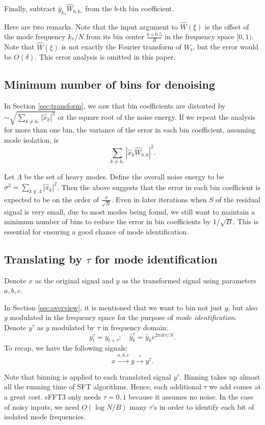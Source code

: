 \documentclass[10pt]{article}
\begin{document}
Finally, subtract $\hat{y}_{k_*} \hat{W}_{b,k_*}$ from the $b$-th bin coefficient.

Here are two remarks. Note that the input argument to $\hat{W}(\xi)$ is the offset of the mode frequency $k_*/N$ from its bin center $\frac{b+0.5}{B}$ in the frequency space $[0,1)$.  Note that $\hat{W}(\xi)$ is not exactly the Fourier transform of $W_t$, but the error would be $O(\delta)$. This error analysis is omitted in this paper.

\subsection{Minimum number of bins for denoising}

In Section \ref{sec:transform}, we saw that bin coefficients are distorted by $\sim \sqrt{\sum_{k\neq k_*} |\hat{x}_k|^2}$ or the square root of the noise energy. If we repeat the analysis for more than one bin, the variance of the error in each bin coefficient, assuming mode isolation, is
$$\sum_{k\neq k_*} |\hat{x}_k \hat{W}_{b,k}|^2.$$

Let $\Lambda$ be the set of heavy modes. Define the overall noise energy to be $\sigma^2 = \sum_{k\not\in \Lambda} |\hat{x}_k|^2$. Then the above suggests that the error in each bin coefficient is expected to be on the order of $\frac{\sigma}{\sqrt{B}}$. Even in later iterations when $S$ of the residual signal is very small, due to most modes being found, we still want to maintain a minimum number of bins to reduce the error in bin coefficients by $1/\sqrt{B}$. This is essential for ensuring a good chance of mode identification.

\subsection{Translating by $\tau$ for mode identification}

Denote $x$ as the original signal and $y$ as the transformed signal using parameters $a,b,c$.

In Section \ref{sec:overview}, it is mentioned that we want to bin not just $y$, but also $y$ modulated in the frequency space for the purpose of \emph{mode identification}. Denote $y^{\tau}$ as $y$ modulated by $\tau$ in frequency domain:
$$y^{\tau}_{t} = y_{t+\tau}; \quad \hat{y}^{\tau}_k = \hat{y}_k e^{2\pi i k \tau/N}.$$
To recap, we have the following signals:
$$x \xrightarrow{a,b,c} y \xrightarrow{\tau} y^{\tau}.$$

Note that binning is applied to each translated signal $y^{\tau}$. Binning takes up almost all the running time of SFT algorithms. Hence, each additional $\tau$ we add comes at a great cost. sFFT3 only needs $\tau=0,1$ because it assumes no noise. In the case of noisy inputs, we need $O(\log N/B)$ many $\tau$'s in order to identify each bit of isolated mode frequencies.
\end{document}

